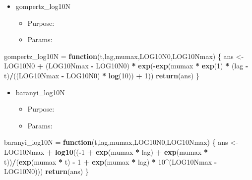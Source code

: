 \documentclass[]{article}
\newenvironment{Shaded}{\begin{snugshade}}{\end{snugshade}}
\newcommand{\ControlFlowTok}[1]{\textcolor[rgb]{0.13,0.29,0.53}{\textbf{#1}}}
\newcommand{\DecValTok}[1]{\textcolor[rgb]{0.00,0.00,0.81}{#1}}
\newcommand{\KeywordTok}[1]{\textcolor[rgb]{0.13,0.29,0.53}{\textbf{#1}}}
\newcommand{\NormalTok}[1]{#1}
\newcommand{\OperatorTok}[1]{\textcolor[rgb]{0.81,0.36,0.00}{\textbf{#1}}}
\newcommand{\StringTok}[1]{\textcolor[rgb]{0.31,0.60,0.02}{#1}}
\providecommand{\tightlist}{%
  \setlength{\itemsep}{0pt}\setlength{\parskip}{0pt}}
\begin{document}
\begin{itemize}
\tightlist
\item
  gompertz\_log10N

  \begin{itemize}
  \tightlist
  \item
    Purpose:
  \item
    Params:
  \end{itemize}
\end{itemize}

\begin{Shaded}
\begin{Highlighting}[]
\NormalTok{gompertz_log10N =}\StringTok{ }\ControlFlowTok{function}\NormalTok{(t,lag,mumax,LOG10N0,LOG10Nmax) \{}
\NormalTok{  ans <-}\StringTok{ }\NormalTok{LOG10N0 }\OperatorTok{+}\StringTok{ }\NormalTok{(LOG10Nmax }\OperatorTok{-}\StringTok{ }\NormalTok{LOG10N0) }\OperatorTok{*}\StringTok{ }\KeywordTok{exp}\NormalTok{(}\OperatorTok{-}\KeywordTok{exp}\NormalTok{(mumax }\OperatorTok{*}\StringTok{ }\KeywordTok{exp}\NormalTok{(}\DecValTok{1}\NormalTok{) }\OperatorTok{*}\StringTok{ }\NormalTok{(lag }\OperatorTok{-}\StringTok{ }\NormalTok{t)}\OperatorTok{/}\NormalTok{((LOG10Nmax }\OperatorTok{-}\StringTok{ }\NormalTok{LOG10N0) }\OperatorTok{*}\StringTok{ }\KeywordTok{log}\NormalTok{(}\DecValTok{10}\NormalTok{)) }\OperatorTok{+}\StringTok{ }\DecValTok{1}\NormalTok{))}
  \KeywordTok{return}\NormalTok{(ans)}
\NormalTok{\}}
\end{Highlighting}
\end{Shaded}

\begin{itemize}
\tightlist
\item
  baranyi\_log10N

  \begin{itemize}
  \tightlist
  \item
    Purpose:
  \item
    Params:
  \end{itemize}
\end{itemize}

\begin{Shaded}
\begin{Highlighting}[]
\NormalTok{baranyi_log10N =}\StringTok{ }\ControlFlowTok{function}\NormalTok{(t,lag,mumax,LOG10N0,LOG10Nmax) \{}
\NormalTok{  ans <-}\StringTok{ }\NormalTok{LOG10Nmax }\OperatorTok{+}\StringTok{ }\KeywordTok{log10}\NormalTok{((}\OperatorTok{-}\DecValTok{1} \OperatorTok{+}\StringTok{ }\KeywordTok{exp}\NormalTok{(mumax }\OperatorTok{*}\StringTok{ }\NormalTok{lag) }\OperatorTok{+}\StringTok{ }\KeywordTok{exp}\NormalTok{(mumax }\OperatorTok{*}\StringTok{ }\NormalTok{t))}\OperatorTok{/}\NormalTok{(}\KeywordTok{exp}\NormalTok{(mumax }\OperatorTok{*}\StringTok{ }\NormalTok{t) }\OperatorTok{-}\StringTok{ }\DecValTok{1} \OperatorTok{+}\StringTok{ }\KeywordTok{exp}\NormalTok{(mumax }\OperatorTok{*}\StringTok{ }\NormalTok{lag) }\OperatorTok{*}\StringTok{ }\DecValTok{10}\OperatorTok{^}\NormalTok{(LOG10Nmax }\OperatorTok{-}\StringTok{ }\NormalTok{LOG10N0)))}
  \KeywordTok{return}\NormalTok{(ans)}
\NormalTok{\}}
\end{Highlighting}
\end{Shaded}
\end{document}
